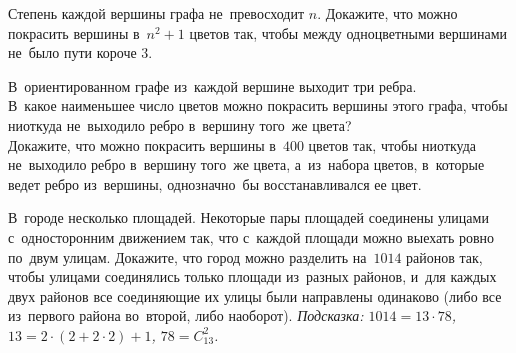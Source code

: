 \begin{problems}
\item
Степень каждой вершины графа не~превосходит $n$.
Докажите, что можно покрасить вершины в~$n^2 + 1$ цветов так, чтобы между
одноцветными вершинами не~было пути короче $3$.

\item
В~ориентированном графе из~каждой вершине выходит три ребра.
\\
\subproblem
В~какое наименьшее число цветов можно покрасить вершины этого графа, чтобы
ниоткуда не~выходило ребро в~вершину того~же цвета?
\\
\subproblem
Докажите, что можно покрасить вершины в~$400$ цветов так, чтобы ниоткуда
не~выходило ребро в~вершину того~же цвета, а~из~набора цветов, в~которые ведет
ребро из~вершины, однозначно~бы восстанавливался ее цвет.

\item
В~городе несколько площадей.
Некоторые пары площадей соединены улицами с~односторонним движением так, что
с~каждой площади можно выехать ровно по~двум улицам.
Докажите, что город можно разделить на~$1014$ районов так, чтобы улицами
соединялись только площади из~разных районов, и~для каждых двух районов все
соединяющие их улицы были направлены одинаково (либо все из~первого района
во~второй, либо наоборот).
\emph{Подсказка:
$1014 = 13 \cdot 78$, $13 = 2 \cdot (2 + 2 \cdot 2) + 1$, $78 = C_{13}^{2}$.}

\end{problems}

